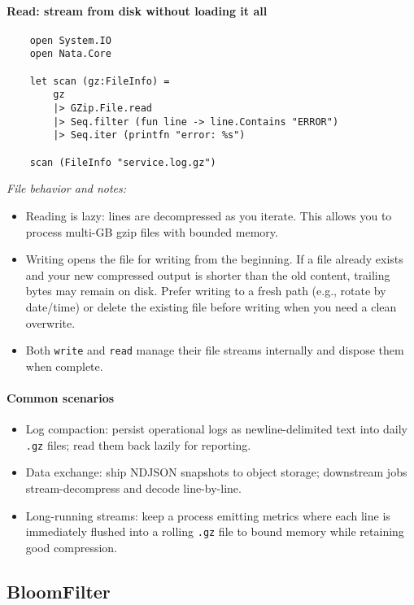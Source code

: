 \documentclass{article}
\begin{document}
\paragraph{Read: stream from disk without loading it all}
\begin{verbatim}
    open System.IO
    open Nata.Core

    let scan (gz:FileInfo) =
        gz
        |> GZip.File.read
        |> Seq.filter (fun line -> line.Contains "ERROR")
        |> Seq.iter (printfn "error: %s")

    scan (FileInfo "service.log.gz")
\end{verbatim}

\emph{File behavior and notes:}
\begin{itemize}
  \item Reading is lazy: lines are decompressed as you iterate. This allows you to process multi-GB gzip files with bounded memory.
  \item Writing opens the file for writing from the beginning. If a file already exists and your new compressed output is shorter than the old content, trailing bytes may remain on disk. Prefer writing to a fresh path (e.g., rotate by date/time) or delete the existing file before writing when you need a clean overwrite.
  \item Both \texttt{write} and \texttt{read} manage their file streams internally and dispose them when complete.
\end{itemize}

\paragraph{Common scenarios}
\begin{itemize}
  \item Log compaction: persist operational logs as newline-delimited text into daily \texttt{.gz} files; read them back lazily for reporting.
  \item Data exchange: ship NDJSON snapshots to object storage; downstream jobs stream-decompress and decode line-by-line.
  \item Long-running streams: keep a process emitting metrics where each line is immediately flushed into a rolling \texttt{.gz} file to bound memory while retaining good compression.
\end{itemize}

\subsection{BloomFilter}
\end{document}
